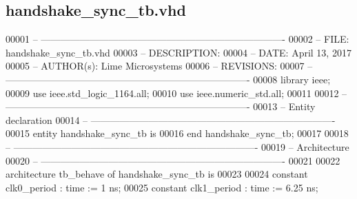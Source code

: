 \subsection{handshake\+\_\+sync\+\_\+tb.\+vhd}
\label{handshake__sync__tb_8vhd_source}

\begin{DoxyCode}
00001 \textcolor{keyword}{-- ---------------------------------------------------------------------------- }
00002 \textcolor{keyword}{-- FILE:    handshake\_sync\_tb.vhd}
00003 \textcolor{keyword}{-- DESCRIPTION: }
00004 \textcolor{keyword}{-- DATE:    April 13, 2017}
00005 \textcolor{keyword}{-- AUTHOR(s):   Lime Microsystems}
00006 \textcolor{keyword}{-- REVISIONS:}
00007 \textcolor{keyword}{-- ---------------------------------------------------------------------------- }
00008 \textcolor{vhdlkeyword}{library }\textcolor{keywordflow}{ieee};
00009 \textcolor{vhdlkeyword}{use }ieee.std\_logic\_1164.\textcolor{keywordflow}{all};
00010 \textcolor{vhdlkeyword}{use }ieee.numeric\_std.\textcolor{keywordflow}{all};
00011 
00012 \textcolor{keyword}{-- ----------------------------------------------------------------------------}
00013 \textcolor{keyword}{-- Entity declaration}
00014 \textcolor{keyword}{-- ----------------------------------------------------------------------------}
00015 \textcolor{keywordflow}{entity }handshake_sync_tb \textcolor{keywordflow}{is}
00016 \textcolor{keywordflow}{end} \textcolor{vhdlchar}{handshake\_sync\_tb};
00017 
00018 \textcolor{keyword}{-- ----------------------------------------------------------------------------}
00019 \textcolor{keyword}{-- Architecture}
00020 \textcolor{keyword}{-- ----------------------------------------------------------------------------}
00021 
00022 \textcolor{keywordflow}{architecture} tb\_behave \textcolor{keywordflow}{of} handshake_sync_tb is
00023 
00024    \textcolor{keywordflow}{constant} \textcolor{vhdlchar}{clk0_period}    \textcolor{vhdlchar}{:} \textcolor{comment}{time} \textcolor{vhdlchar}{:=} \textcolor{vhdllogic}{}\textcolor{vhdllogic}{1} \textcolor{vhdlchar}{ns}; 
00025    \textcolor{keywordflow}{constant} \textcolor{vhdlchar}{clk1_period}    \textcolor{vhdlchar}{:} \textcolor{comment}{time} \textcolor{vhdlchar}{:=} \textcolor{vhdllogic}{}\textcolor{vhdllogic}{6}.\textcolor{vhdllogic}{25} \textcolor{vhdlchar}{ns}; 

\end{DoxyCode}
